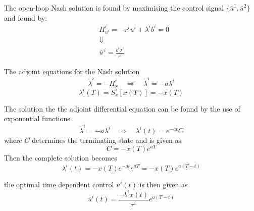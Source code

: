 The open-loop Nash solution is found by maximising the control signal $\{\bar{u}^{1},\bar{u}^{2}\}$ and found by:
\begin{equation}
        \begin{split}
                &H^i_{u^i} = - r^i u^i + \lambda^i b^i = 0\\
                &\Downarrow\\
                &\bar{u}^{\,i} = \frac{b^i \lambda^i}{r^i}
        \end{split}
\end{equation}

The adjoint equations for the Nash solution
\begin{equation}
        \dot{\lambda}^i = -H^i_{x} \quad \Rightarrow \quad \dot{\lambda}^i = -a \lambda^i
\end{equation}
\begin{equation}
        \lambda^i(T) = S_{x}^i \left[x(T)\right]  = -x(T)
\end{equation}

The solution the the adjoint differential equation can be found by the use of exponential functions.
\begin{equation}
        \dot{\lambda}^i = -a \lambda^i \quad \Rightarrow \quad \lambda^i(t) = e^{-a t}C
\end{equation}
where $C$ determines the terminating state and is given as
\begin{equation}
        C = -x(T) e^{aT}
\end{equation}
Then the complete solution becomes
\begin{equation}
        \lambda^i(t) = -x(T) e^{-a t} e^{aT} = -x(T)e^{a(T-t)}
\end{equation}

the optimal time dependent control $\bar{u}^i(t)$ is then given as
\begin{equation}
        \bar{u}^i(t) = \frac{-b^i x(t)}{r^i} e^{a(T-t)}
\end{equation}